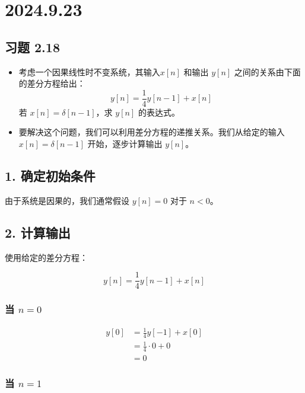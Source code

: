 \documentclass[UTF8]{report}
\theoremstyle{MyLineTheoremStyle} %
\theoremstyle{MyBlockTheoremStyle} %
\theoremstyle{MySubsubsectionStyle} %
\begin{document}
\chapter{2024.9.23}\thispagestyle{fancy}

\section{习题 2.18}
\begin{itemize}
        \item 考虑一个因果线性时不变系统，其输入$x[n]$ 和输出 $y[n]$ 之间的关系由下面的差分方程给出：
        \[
            y[n] = \frac{1}{4}y[n-1] + x[n]
        \]
        若 $x[n] = \delta[n-1]$，求 $y[n]$ 的表达式。
        
            \item 要解决这个问题，我们可以利用差分方程的递推关系。我们从给定的输入 $x[n] = \delta[n-1]$ 开始，逐步计算输出 $y[n]$。
\end{itemize}


\section*{1. 确定初始条件}

由于系统是因果的，我们通常假设 $y[n] = 0$ 对于 $n < 0$。

\section*{2. 计算输出}

使用给定的差分方程：

\begin{equation}
    y[n] = \frac{1}{4} y[n-1] + x[n]
\end{equation}

\subsection*{当 $n = 0$}

\begin{align*}
    y[0] &= \frac{1}{4} y[-1] + x[0] \\
          &= \frac{1}{4} \cdot 0 + 0 \\
          &= 0
\end{align*}

\subsection*{当 $n = 1$}
\end{document}
